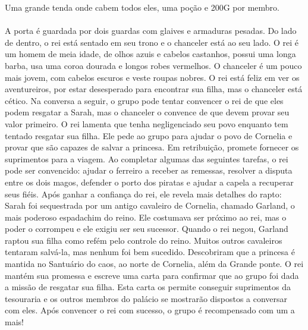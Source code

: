 Uma grande tenda onde cabem todos eles, uma poção e 200G por membro.
%
\ofpar
%
\\\\
%
 A porta é guardada por dois guardas com glaives e armaduras pesadas. 
Do lado de dentro, o rei está sentado em seu trono e o chanceler está ao seu lado.
O rei é um homem de meia idade, de olhos azuis e cabelos castanhos, possui uma longa barba, usa uma coroa dourada e longos robes vermelhos.
O chanceler é um pouco mais jovem, com cabelos escuros e veste roupas nobres.
O rei está feliz em ver os aventureiros, por estar desesperado para encontrar sua filha, mas o chanceler está cético.
Na conversa a seguir, o grupo pode tentar convencer o rei de que eles podem resgatar a Sarah, mas o chanceler o convence de que devem provar seu valor primeiro.
O rei lamenta que tenha negligenciado seu povo enquanto tem tentado resgatar sua filha.
Ele pede ao grupo para ajudar o povo de Cornelia e provar que são capazes de salvar a princesa. Em retribuição, promete fornecer os suprimentos para a viagem.
Ao completar algumas das seguintes tarefas, o rei pode ser convencido: ajudar o ferreiro a receber as remessas, resolver a disputa entre os dois magos, defender o porto dos piratas e ajudar a capela a recuperar seus fiéis.
Após ganhar a confiança do rei, ele revela mais detalhes do rapto: Sarah foi sequestrada por um antigo cavaleiro de Cornelia, chamado Garland, o mais poderoso espadachim do reino.
Ele costumava ser próximo ao rei, mas o poder o corrompeu e ele exigiu ser seu sucessor.
Quando o rei negou, Garland raptou sua filha como refém pelo controle do reino.
Muitos outros cavaleiros tentaram salvá-la, mas nenhum foi bem sucedido. Descobriram que a princesa é mantida no Santuário do caos, ao norte de Cornelia, além da Grande ponte.
O rei mantém sua promessa e escreve uma carta para confirmar que ao grupo foi dada a missão de resgatar sua filha.
Esta carta os permite conseguir suprimentos da tesouraria e os outros membros do palácio se mostrarão dispostos a conversar com eles.
Após convencer o rei com sucesso, o grupo é recompensado com um  a mais!
%
\vfill
%
